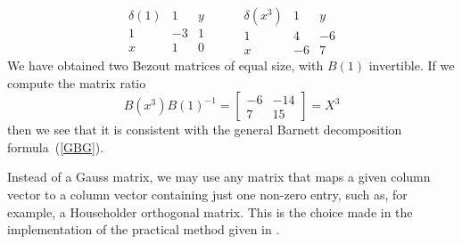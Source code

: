 \documentclass{standalone}
\begin{document}
$$
\begin{array}{c|cc}
	\delta(1) & 1 & y \\
	\hline
	1 & -3 & 1 \\
	x & 1 & 0
\end{array}
\hspace{1cm}
\begin{array}{c|cc}
	\delta(x^3) & 1 & y \\
	\hline
	1 & 4 & -6  \\
	x & -6 & 7
\end{array}
$$
We have obtained two Bezout matrices of equal size, with $B(1)$ invertible. 
If we compute the matrix ratio
\begin{equation}
	B(x^3)B(1)^{-1} =
	\begin{bmatrix}
		-6 & -14 \\
		7 & 15
	\end{bmatrix}
	= X^3
\end{equation}
then we see that it is consistent with the general Barnett decomposition formula~(\ref{GBG}).

\begin{rem}
Instead of a Gauss matrix, we may use any matrix that maps a given column vector to a column vector containing just one non-zero entry, such as, for example, a Householder orthogonal matrix. This is the choice made in the implementation of the practical method given in \cite{jp_code}.

\end{rem}
\end{document}

